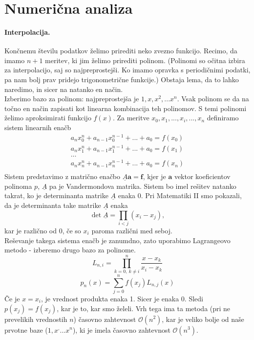 \documentclass[a4paper]{article}
\begin{document}
\section{Numerična analiza}
\paragraph{Interpolacija.} Končnemu številu podatkov želimo prirediti neko zvezno funkcijo. Recimo, da imamo $n+1$ meritev,
ki jim želimo prirediti polinom. (Polinomi so očitna izbira za interpolacijo, saj so najpreprostejši. Ko imamo opravka s periodičnimi podatki, pa nam bolj prav pridejo trigonometrične funkcije.)
Obstaja lema, da to lahko naredimo, in sicer na natanko en način. \\[3mm]
Izberimo bazo za polinom: najpreprostejša je $1, x, x^2, ... x^n$. Vsak polinom se da na točno en način zapisati kot linearna kombinacija
teh polinomov. S temi polinomi želimo aproksimirati funkcijo $f(x)$. Za meritve $x_0, x_1, ... , x_i, ..., x_n$ definiramo sistem linearnih enačb
\begin{eqnarray*}
    a_nx_0^n + a_{n-1}x_0^{n-1} + ... + a_0 = f(x_0) \\
    a_nx_1^n + a_{n-1}x_1^{n-1} + ... + a_0 = f(x_1) \\
    \dots \\
    a_nx_n^n + a_{n-1}x_n^{n-1} + ... + a_0 = f(x_n) \\
\end{eqnarray*}
Sistem predstavimo z matrično enačbo $\underline{A}\mathbf{a} = \mathbf{f}$, kjer je $\mathbf{a}$ vektor koeficientov polinoma $p$, $\underline{A}$ pa je Vandermondova matrika.
Sistem bo imel rešitev natanko takrat, ko je determinanta matrike $\underline{A}$ enaka 0. Pri Matematiki II smo pokazali, da je determinanta take matrike $\underline{A}$ enaka
$$\det\underline{A}=\prod_{i<j}(x_i - x_j),$$ kar je različno od 0, če so $x_i$ paroma različni med seboj. \\
Reševanje takega sistema enačb je zanumdno, zato uporabimo Lagrangeovo metodo - izberemo drugo bazo za polinome.
$$L_{n, i} = \prod_{k = 0,~k \neq i}^{n}\frac{x - x_k}{x_i - x_k}$$
$$p_n(x) = \sum_{j=0}^{n}f(x_j)L_{n,j}(x)$$
Če je $x = x_i$, je vrednost produkta enaka 1. Sicer je enaka 0. Sledi $p(x_j) = f(x_j)$, kar je to, kar smo želeli. Vrh tega ima ta metoda (pri ne prevelikih vrednostih $n$) časovno zahtevnost $\mathcal{O}(n^2)$, kar je veliko bolje od naše prvotne baze ($1, x^, ... x^n$), ki je imela časovno zahtevnost $\mathcal{O}(n^3)$. \\[3mm]
\end{document}
